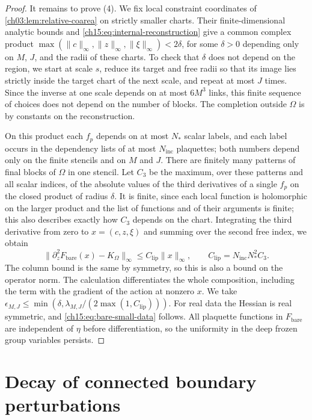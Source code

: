 \begin{proof}
It remains to prove (4). We fix local constraint coordinates of \cref{ch03:lem:relative-coarea} on strictly smaller charts. Their finite-dimensional analytic bounds and \eqref{ch15:eq:internal-reconstruction} give a common complex product $\max(\|c\|_\infty,\|z\|_\infty,\|\xi\|_\infty)<2\delta$, for some $\delta>0$ depending only on $M$, $J$, and the radii of these charts. To check that $\delta$ does not depend on the region, we start at scale $s$, reduce its target and free radii so that its image lies strictly inside the target chart of the next scale, and repeat at most $J$ times. Since the inverse at one scale depends on at most $6M^3$ links, this finite sequence of choices does not depend on the number of blocks. The completion outside $\Omega$ is by constants on the reconstruction.

On this product each $f_p$ depends on at most $N_*$ scalar labels, and each label occurs in the dependency lists of at most $N_{\mathrm{inc}}$ plaquettes; both numbers depend only on the finite stencils and on $M$ and $J$. There are finitely many patterns of final blocks of $\Omega$ in one stencil. Let $C_3$ be the maximum, over these patterns and all scalar indices, of the absolute values of the third derivatives of a single $f_p$ on the closed product of radius $\delta$. It is finite, since each local function is holomorphic on the larger product and the list of functions and of their arguments is finite; this also describes exactly how $C_3$ depends on the chart. Integrating the third derivative from zero to $x=(c,z,\xi)$ and summing over the second free index, we obtain
\[
 \|\partial_z^2F_{\mathrm{bare}}(x)-K_\Omega\|_\infty
       \le C_{\mathrm{lip}}\|x\|_\infty,
 \qquad C_{\mathrm{lip}}=N_{\mathrm{inc}}N_*^2C_3 .
\]
The column bound is the same by symmetry, so this is also a bound on the operator norm. The calculation differentiates the whole composition, including the term with the gradient of the action at nonzero $x$. We take $\epsilon_{M,J}\le\min(\delta,\lambda_{M,J}/(2\max(1,C_{\mathrm{lip}})))$. For real data the Hessian is real symmetric, and \eqref{ch15:eq:bare-small-data} follows. All plaquette functions in $F_{\mathrm{bare}}$ are independent of $\eta$ before differentiation, so the uniformity in the deep frozen group variables persists.
\end{proof}

\section{Decay of connected boundary perturbations}\label{ch15:sec:networks}


